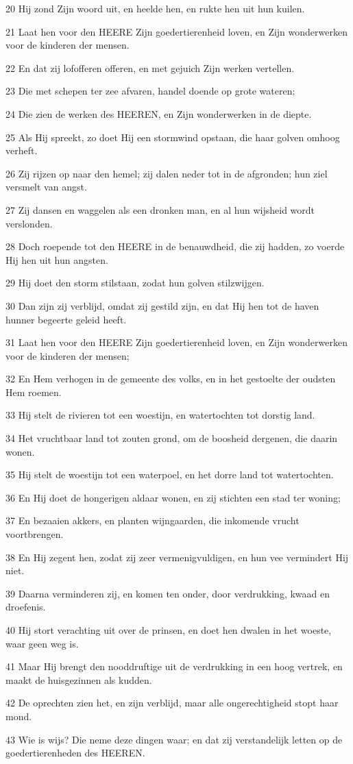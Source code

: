 \par 20 Hij zond Zijn woord uit, en heelde hen, en rukte hen uit hun kuilen.
\par 21 Laat hen voor den HEERE Zijn goedertierenheid loven, en Zijn wonderwerken voor de kinderen der mensen.
\par 22 En dat zij lofofferen offeren, en met gejuich Zijn werken vertellen.
\par 23 Die met schepen ter zee afvaren, handel doende op grote wateren;
\par 24 Die zien de werken des HEEREN, en Zijn wonderwerken in de diepte.
\par 25 Als Hij spreekt, zo doet Hij een stormwind opstaan, die haar golven omhoog verheft.
\par 26 Zij rijzen op naar den hemel; zij dalen neder tot in de afgronden; hun ziel versmelt van angst.
\par 27 Zij dansen en waggelen als een dronken man, en al hun wijsheid wordt verslonden.
\par 28 Doch roepende tot den HEERE in de benauwdheid, die zij hadden, zo voerde Hij hen uit hun angsten.
\par 29 Hij doet den storm stilstaan, zodat hun golven stilzwijgen.
\par 30 Dan zijn zij verblijd, omdat zij gestild zijn, en dat Hij hen tot de haven hunner begeerte geleid heeft.
\par 31 Laat hen voor den HEERE Zijn goedertierenheid loven, en Zijn wonderwerken voor de kinderen der mensen;
\par 32 En Hem verhogen in de gemeente des volks, en in het gestoelte der oudsten Hem roemen.
\par 33 Hij stelt de rivieren tot een woestijn, en watertochten tot dorstig land.
\par 34 Het vruchtbaar land tot zouten grond, om de boosheid dergenen, die daarin wonen.
\par 35 Hij stelt de woestijn tot een waterpoel, en het dorre land tot watertochten.
\par 36 En Hij doet de hongerigen aldaar wonen, en zij stichten een stad ter woning;
\par 37 En bezaaien akkers, en planten wijngaarden, die inkomende vrucht voortbrengen.
\par 38 En Hij zegent hen, zodat zij zeer vermenigvuldigen, en hun vee vermindert Hij niet.
\par 39 Daarna verminderen zij, en komen ten onder, door verdrukking, kwaad en droefenis.
\par 40 Hij stort verachting uit over de prinsen, en doet hen dwalen in het woeste, waar geen weg is.
\par 41 Maar Hij brengt den nooddruftige uit de verdrukking in een hoog vertrek, en maakt de huisgezinnen als kudden.
\par 42 De oprechten zien het, en zijn verblijd, maar alle ongerechtigheid stopt haar mond.
\par 43 Wie is wijs? Die neme deze dingen waar; en dat zij verstandelijk letten op de goedertierenheden des HEEREN.

